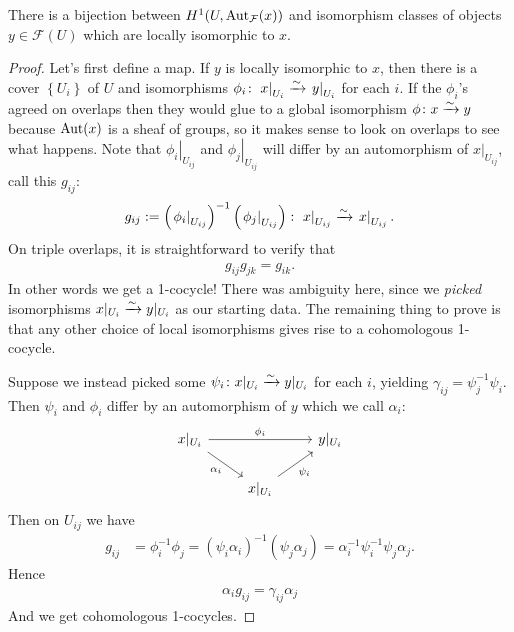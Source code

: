 \documentclass[11pt]{amsart}
\begin{document}
\begin{theorem} There is a bijection between $H^1(U,\mathrm{Aut}_{\mathcal{F}}(x))$ and isomorphism classes of objects $y\in \mathscr{F}(U)$ which are locally isomorphic to $x$.
\end{theorem}
\begin{proof} Let's first define a map. If $y$ is locally isomorphic to $x$, then there is a cover $\left\{ U_i \right\}$ of $U$ and isomorphisms $\phi_i \colon \left. x \right|_{ U_i } \xrightarrow{\sim} \left. y \right|_{ U_i }$ for each $i$. If the $\phi_i$'s agreed on overlaps then they would glue to a global isomorphism $\phi \colon x \xrightarrow{\sim} y$ because $\mathrm{Aut}(x)$ is a sheaf of groups, so it makes sense to look on overlaps to see what happens. Note that $\left. \phi_i \right|_{ U_{ij} }$ and $\left. \phi_j \right|_{ U_{ij} }$ will differ by an automorphism of $\left. x \right|_{ U_{ij} }$, call this $g_{ij}$:
\begin{align*}
    g_{ij} := \left( \left. \phi_i \right|_{ U_{ij} } \right)^{-1} \left( \left. \phi_j \right|_{ U_{ij} } \right) \colon \left. x \right|_{ U_{ij}  }\xrightarrow{\sim} \left. x \right|_{ U_{ij} }.
\end{align*}
On triple overlaps, it is straightforward to verify that
\begin{align*}
    g_{ij}g_{jk} = g_{ik}.
\end{align*}
In other words we get a 1-cocycle! There was ambiguity here, since we \textit{picked} isomorphisms $x|_{U_i} \xrightarrow{\sim} y|_{U_i}$ as our starting data. The remaining thing to prove is that any other choice of local isomorphisms gives rise to a cohomologous 1-cocycle.

Suppose we instead picked some $\psi_i \colon x|_{U_i} \xrightarrow{\sim} y|_{U_i}$ for each $i$, yielding $\gamma_{ij} = \psi_j^{-1}\psi_i $. Then $\psi_i$ and $\phi_i$ differ by an automorphism of $y$ which we call $\alpha_i$:
\[ \begin{tikzcd}
    x|_{U_i}\ar[rr,"\phi_i"]\ar[dr,"\alpha_i" below left] &  & y|_{U_i}\\
     & x|_{U_i}\ar[ur,"\psi_i" below right] & 
\end{tikzcd} \]
%
Then on $U_{ij}$ we have
\begin{align*}
    g_{ij} &= \phi_i^{-1} \phi_j = \left( \psi_i \alpha_i \right)^{-1} \left( \psi_j \alpha_j \right) = \alpha_i^{-1} \psi_i^{-1}\psi_j \alpha_j.
\end{align*}
Hence
\begin{align*}
    \alpha_i g_{ij} = \gamma_{ij}\alpha_j
\end{align*}
And we get cohomologous 1-cocycles.
\end{proof}
\end{document}
